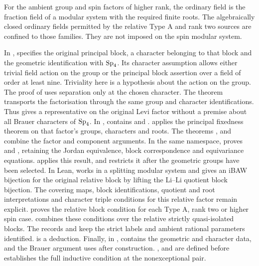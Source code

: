 For the ambient group and spin factors of higher rank, the ordinary field
is the fraction field of a modular system with the required finite roots.
The algebraically closed ordinary fields permitted by the relative Type A and
rank two sources are confined to those families. They are not
imposed on the spin modular system.

\begin{implementation}
In ,  specifies the
original principal block, a character belonging to that block and the geometric
identification with $\operatorname{Sp}_4$. Its character assumption allows either
trivial field action on the group or the principal block assertion over
a field of order at least nine. Triviality here is a hypothesis about
the action on the group. The proof of
 uses separation only at the chosen
character. The theorem  transports the
factorisation through the same group and character identifications.
Thus  gives a representative on the original
Levi factor without a premise about all Brauer characters of $\operatorname{Sp}_4$.
In ,
 contains 
and .
 applies the principal
fixedness theorem on that factor's groups, characters and roots.
The theorems , 
and  combine the factor and component
arguments. In the same namespace,
 proves
 and , retaining
the Jordan equivalence, block correspondence and equivariance equations.
 applies this result, and
 restricts it after the geometric groups have
been selected.
In Lean,  works in a splitting
modular system and gives an iBAW bijection for the original
relative block by lifting the Li--Li quotient block bijection. The covering maps, block identifications,
quotient and root interpretations and character triple conditions for
this relative factor remain explicit.
 proves the
relative block condition for each Type A, rank two or higher spin case.
 combines these
conditions over the relative strictly quasi-isolated blocks. The records 
and  keep the
strict labels and ambient rational parameters identified.
 is a deduction.
Finally, in ,
 contains the geometric and character data, and the Brauer
argument uses  after construction.
,  and 
are defined before  establishes the full inductive
condition at the nonexceptional pair.
\end{implementation}

